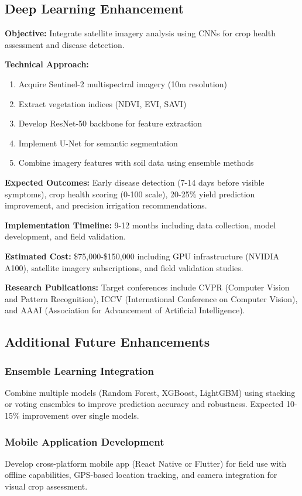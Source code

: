 \documentclass[conference]{IEEEtran}
\begin{document}
\subsection{Deep Learning Enhancement}
\textbf{Objective:} Integrate satellite imagery analysis using CNNs for crop health assessment and disease detection.

\textbf{Technical Approach:}
\begin{enumerate}
    \item Acquire Sentinel-2 multispectral imagery (10m resolution)
    \item Extract vegetation indices (NDVI, EVI, SAVI)
    \item Develop ResNet-50 backbone for feature extraction
    \item Implement U-Net for semantic segmentation
    \item Combine imagery features with soil data using ensemble methods
\end{enumerate}

\textbf{Expected Outcomes:} Early disease detection (7-14 days before visible symptoms), crop health scoring (0-100 scale), 20-25\% yield prediction improvement, and precision irrigation recommendations.

\textbf{Implementation Timeline:} 9-12 months including data collection, model development, and field validation.

\textbf{Estimated Cost:} \$75,000-\$150,000 including GPU infrastructure (NVIDIA A100), satellite imagery subscriptions, and field validation studies.

\textbf{Research Publications:} Target conferences include CVPR (Computer Vision and Pattern Recognition), ICCV (International Conference on Computer Vision), and AAAI (Association for Advancement of Artificial Intelligence).

\subsection{Additional Future Enhancements}

\subsubsection{Ensemble Learning Integration}
Combine multiple models (Random Forest, XGBoost, LightGBM) using stacking or voting ensembles to improve prediction accuracy and robustness. Expected 10-15\% improvement over single models.

\subsubsection{Mobile Application Development}
Develop cross-platform mobile app (React Native or Flutter) for field use with offline capabilities, GPS-based location tracking, and camera integration for visual crop assessment.
\end{document}
